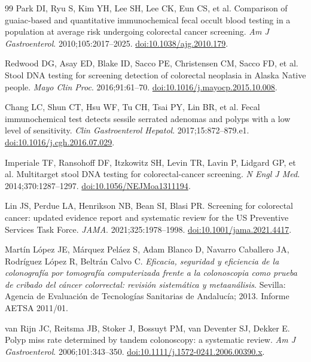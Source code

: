 \documentclass[10pt,a4paper]{article}
\begin{document}
\begin{thebibliography}{99}
Park DI, Ryu S, Kim YH, Lee SH, Lee CK, Eun CS, et al.
Comparison of guaiac-based and quantitative immunochemical fecal occult
blood testing in a population at average risk undergoing colorectal cancer
screening.
\textit{Am J Gastroenterol}. 2010;105:2017--2025.
\href{https://doi.org/10.1038/ajg.2010.179}{doi:10.1038/ajg.2010.179}.

Redwood DG, Asay ED, Blake ID, Sacco PE, Christensen CM, Sacco FD, et al.
Stool DNA testing for screening detection of colorectal neoplasia in Alaska
Native people.
\textit{Mayo Clin Proc}. 2016;91:61--70.
\href{https://doi.org/10.1016/j.mayocp.2015.10.008}{doi:10.1016/j.mayocp.2015.10.008}.

Chang LC, Shun CT, Hsu WF, Tu CH, Tsai PY, Lin BR, et al.
Fecal immunochemical test detects sessile serrated adenomas and polyps with
a low level of sensitivity.
\textit{Clin Gastroenterol Hepatol}. 2017;15:872--879.e1.
\href{https://doi.org/10.1016/j.cgh.2016.07.029}{doi:10.1016/j.cgh.2016.07.029}.

Imperiale TF, Ransohoff DF, Itzkowitz SH, Levin TR, Lavin P, Lidgard GP,
et al.
Multitarget stool DNA testing for colorectal-cancer screening.
\textit{N Engl J Med}. 2014;370:1287--1297.
\href{https://doi.org/10.1056/NEJMoa1311194}{doi:10.1056/NEJMoa1311194}.

Lin JS, Perdue LA, Henrikson NB, Bean SI, Blasi PR.
Screening for colorectal cancer: updated evidence report and systematic
review for the US Preventive Services Task Force.
\textit{JAMA}. 2021;325:1978--1998.
\href{https://doi.org/10.1001/jama.2021.4417}{doi:10.1001/jama.2021.4417}.

Mart\'in L\'opez JE, M\'arquez Pel\'aez S, Adam Blanco D,
Navarro Caballero JA, Rodr\'iguez L\'opez R, Beltr\'an Calvo C.
\textit{Eficacia, seguridad y eficiencia de la colonograf\'ia por
tomograf\'ia computerizada frente a la colonoscopia como prueba de cribado
del c\'ancer colorrectal: revisi\'on sistem\'atica y metaan\'alisis}.
Sevilla: Agencia de Evaluaci\'on de Tecnolog\'ias Sanitarias de
Andaluc\'ia; 2013. Informe AETSA 2011/01.

van Rijn JC, Reitsma JB, Stoker J, Bossuyt PM, van Deventer SJ, Dekker E.
Polyp miss rate determined by tandem colonoscopy: a systematic review.
\textit{Am J Gastroenterol}. 2006;101:343--350.
\href{https://doi.org/10.1111/j.1572-0241.2006.00390.x}{doi:10.1111/j.1572-0241.2006.00390.x}.


\end{thebibliography}
\end{document}

